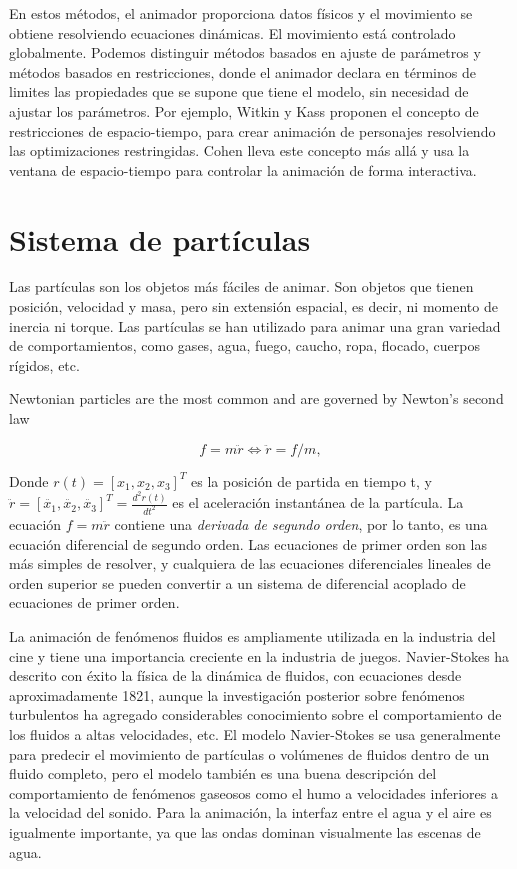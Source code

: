 \documentclass[a4paper,12pt]{report}
\begin{document}
 
En estos métodos, el animador proporciona datos físicos y el movimiento se obtiene resolviendo
ecuaciones dinámicas. El movimiento está controlado globalmente. Podemos distinguir métodos basados en
ajuste de parámetros\cite{parametros} y métodos basados en restricciones, donde el animador declara en términos de
limites las propiedades que se supone que tiene el modelo, sin necesidad de ajustar los parámetros.
Por ejemplo, Witkin y Kass\cite{witkin_kass} proponen el concepto de restricciones de espacio-tiempo, para crear
animación de personajes resolviendo las optimizaciones restringidas. Cohen\cite{cohen} lleva este concepto más allá
y usa la ventana de espacio-tiempo para controlar la animación de forma interactiva.
 
\section{Sistema de partículas}
 

Las partículas son los objetos más fáciles de animar. Son objetos que tienen posición, velocidad y masa, pero
sin extensión espacial, es decir, ni momento de inercia ni torque. Las partículas se han utilizado para animar una gran
variedad de comportamientos, como gases, agua, fuego, caucho, ropa, flocado, cuerpos rígidos, etc.\cite{particle_system}
 
Newtonian particles are the most common and are governed by Newton’s second law
 
\begin{equation}
f = m \ddot{r} \Leftrightarrow \ddot{r} = f/m,
\label{eq:1}
\end{equation}
 
 
Donde  \(r(t) \displaystyle = [x_1,x_2,x_3]^T\) es la posición de partida en tiempo t, y
\(\ddot{r} \displaystyle = [\ddot{x_1},\ddot{x_2},\ddot{x_3}]^T = \frac{d^2 r(t)}{dt^2} \) es el
aceleración instantánea de la partícula. La ecuación \(f \displaystyle = m \ddot{r}\) contiene una \textit{derivada de segundo orden},
por lo tanto, es una ecuación diferencial de segundo orden. Las ecuaciones de primer orden son las más simples de resolver, y cualquiera
de las ecuaciones diferenciales lineales de orden superior se pueden convertir a un sistema de diferencial acoplado de ecuaciones de primer orden.\cite{particle_system}
 
 
La animación de fenómenos fluidos es ampliamente utilizada en la industria del cine y tiene una importancia creciente en la
industria de juegos. Navier-Stokes ha descrito con éxito la física de la dinámica de fluidos, con ecuaciones desde aproximadamente 1821,
aunque la investigación posterior sobre fenómenos turbulentos ha agregado considerables
conocimiento sobre el comportamiento de los fluidos a altas velocidades, etc. El modelo Navier-Stokes se usa generalmente para
predecir el movimiento de partículas o volúmenes de fluidos dentro de un fluido completo, pero el modelo también es una buena descripción del
comportamiento de fenómenos gaseosos como el humo a velocidades inferiores a la velocidad del sonido. Para la animación,
la interfaz entre el agua y el aire es igualmente importante, ya que las ondas dominan visualmente las escenas de agua.\cite{particle_system}
 
\end{document}
